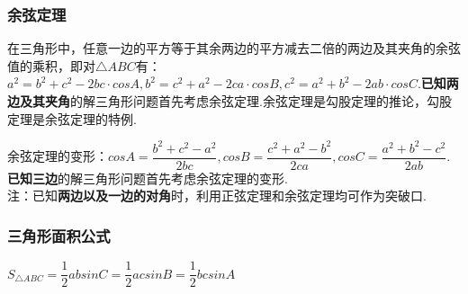 \subsubsection*{余弦定理}
在三角形中，任意一边的平方等于其余两边的平方减去二倍的两边及其夹角的余弦值的乘积，即对$\triangle ABC$有：$a^2 = b^2 + c^2 - 2bc \cdot cosA, b^2 = c^2 + a^2 - 2ca \cdot cosB, c^2 = a^2 + b^2 - 2ab \cdot cosC$.\textbf{已知两边及其夹角}的解三角形问题首先考虑余弦定理.余弦定理是勾股定理的推论，勾股定理是余弦定理的特例.
\par 余弦定理的变形：$cosA = \dfrac{b^2 + c^2 - a^2}{2bc}, cosB = \dfrac{c^2 + a^2 - b^2}{2ca}, cosC = \dfrac{a^2 + b^2 - c^2}{2ab}$.\textbf{已知三边}的解三角形问题首先考虑余弦定理的变形.\\
注：已知\textbf{两边以及一边的对角}时，利用正弦定理和余弦定理均可作为突破口.

\subsubsection*{三角形面积公式}
$S_{\triangle ABC} = \dfrac{1}{2}absinC = \dfrac{1}{2}acsinB = \dfrac{1}{2}bcsinA$

